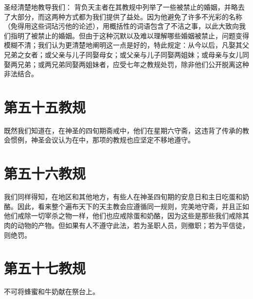 圣经清楚地教导我们： 背负天主者在其教规中列举了一些被禁止的婚姻，并略去了大部分，而这两种方式都为我们提供了益处。因为他避免了许多不光彩的名称（免得用这些词玷污他的论述），用概括性的词语包含了不洁之事，以此大致向我们指明了被禁止的婚姻。但由于这种沉默以及难以理解哪些婚姻被禁止，问题变得模糊不清；我们认为更清楚地阐明这一点是好的，特此规定：从今以后，凡娶其父兄弟之女者；或父亲与儿子同娶母女；或父亲与儿子同娶两姐妹；或母亲与女儿同娶两兄弟；或两兄弟同娶两姐妹者，应受七年之教规处罚，除非他们公开脱离这种非法结合。\par


\section{第五十五教规}

既然我们知道在，在神圣的四旬期斋戒中，他们在星期六守斋，这违背了传承的教会惯例，神圣会议认为在中，那项的教规也应坚定不移地遵守。\par


\section{第五十六教规}

我们同样得知，在地区和其他地方，有些人在神圣四旬期的安息日和主日吃蛋和奶酪。因此，看来整个遍布天下的天主教会应遵循同一规则，完美地守斋，并且正如他们戒除一切宰杀之物一样，他们也应戒除蛋和奶酪，因为这些是那些我们戒除其肉的动物的产物。但如果有人不遵守此法，若为圣职人员，则撤职；若为平信徒，则绝罚。\par


\section{第五十七教规}

不可将蜂蜜和牛奶献在祭台上。\par


